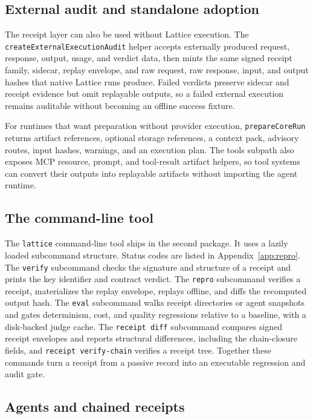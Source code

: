 \documentclass[conference]{IEEEtran}
\newcommand{\code}[1]{\texttt{\small #1}}
\begin{document}
\subsection{External audit and standalone adoption}

The receipt layer can also be used without Lattice execution. The
\code{createExternalExecutionAudit} helper accepts externally produced request,
response, output, usage, and verdict data, then mints the same signed receipt family,
sidecar, replay envelope, and raw request, raw response, input, and output hashes that
native Lattice runs produce. Failed verdicts preserve sidecar and receipt evidence but
omit replayable outputs, so a failed external execution remains auditable without
becoming an offline success fixture.

For runtimes that want preparation without provider execution, \code{prepareCoreRun}
returns artifact references, optional storage references, a context pack, advisory
routes, input hashes, warnings, and an execution plan. The tools subpath also exposes
MCP resource, prompt, and tool-result artifact helpers, so tool systems can convert
their outputs into replayable artifacts without importing the agent runtime.

\subsection{The command-line tool}

The \code{lattice} command-line tool ships in the second package. It uses a lazily
loaded subcommand structure. Status codes are listed in Appendix~\ref{app:repro}. The
\code{verify} subcommand checks the signature and structure of a receipt and prints the
key identifier and contract verdict. The \code{repro} subcommand verifies a receipt,
materializes the replay envelope, replays offline, and diffs the recomputed output
hash. The \code{eval} subcommand walks receipt directories or agent snapshots and gates
determinism, cost, and quality regressions relative to a baseline, with a disk-backed
judge cache. The \code{receipt diff} subcommand compares signed receipt envelopes and
reports structural differences, including the chain-closure fields, and
\code{receipt verify-chain} verifies a receipt tree. Together these commands turn a receipt from a passive
record into an executable regression and audit gate.

\subsection{Agents and chained receipts}
\label{sec:chains}
\end{document}
